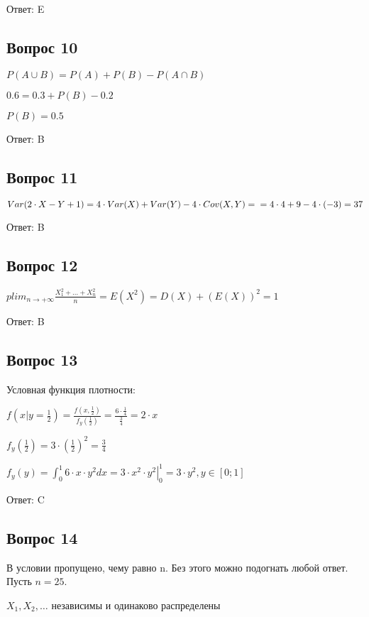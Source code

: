\documentclass{article}
\begin{document}
\begin{flushleft}
Ответ: E

\subsection{Вопрос 10}

$P(A\cup B) = P(A) + P(B) - P(A\cap B)$

$0.6 = 0.3 + P(B) - 0.2$

$P(B) = 0.5$

Ответ: B

\subsection{Вопрос 11}

$Var(2\cdot X - Y + 1) = 4\cdot Var(X) + Var(Y) - 4 \cdot Cov(X,Y) = \\ = 4 \cdot 4 + 9 - 4 \cdot (-3) = 37$

Ответ: B

\subsection{Вопрос 12}

$plim _{n\rightarrow +\infty}\frac{X_{1}^2 + \dots + X_{n}^2}{n} = E(X^2) = D(X) +(E(X))^2 = 1$

Ответ: B

\subsection{Вопрос 13}

Условная функция плотности:

$f(x|y=\frac{1}{2}) = \frac{f(x,\frac{1}{2})}{f_{y}(\frac{1}{2})} = \frac{6\cdot\frac{1}{4}}{\frac{3}{4}} = 2 \cdot x$

$f_{y}(\frac{1}{2}) = 3 \cdot (\frac{1}{2})^2 = \frac{3}{4}$

$f_{y}(y) = \int_0^1 6\cdot x\cdot y^2 dx = \left.3 \cdot x^2 \cdot y^2\right|_0^1  = 3 \cdot y^2, y \in [0;1] $

Ответ: C

\subsection{Вопрос 14}

В условии пропущено, чему равно n. Без этого можно подогнать любой ответ. Пусть $n = 25$.

$X_{1}, X_{2}, \dots$ независимы и одинаково распределены


\end{flushleft}
\end{document}
